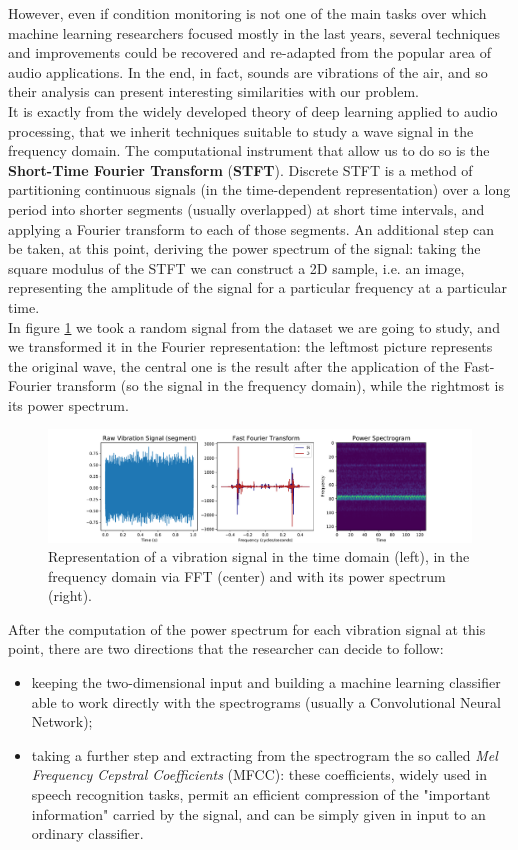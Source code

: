 \documentclass[../main.tex]{subfiles}
\begin{document}
However, even if condition monitoring is not one of the main tasks over which machine learning researchers focused mostly in the last years, several techniques and improvements could be recovered and re-adapted from the popular area of audio applications. In the end, in fact, sounds are vibrations of the air, and so their analysis can present interesting similarities with our problem.\\
It is exactly from the widely developed theory of deep learning applied to audio processing, that we inherit techniques suitable to study a wave signal in the frequency domain. The computational instrument that allow us to do so is the \textbf{Short-Time Fourier Transform} (\textbf{STFT}). Discrete STFT is a method of partitioning
continuous signals (in the time-dependent representation) over a long period into shorter segments (usually overlapped) at short time intervals, and
applying a Fourier transform to each of those segments. An additional step can be taken, at this point, deriving the power spectrum of the signal: taking the square modulus of the STFT we can construct a 2D sample, i.e. an image, representing the amplitude of the signal for a particular frequency at a particular time.\\
In figure \ref{fig:example_stft} we took a random signal from the dataset we are going to study, and we transformed it in the Fourier representation: the leftmost picture represents the original wave, the central one is the result after the application of the Fast-Fourier transform (so the signal in the frequency domain), while the rightmost is its power spectrum. 
\begin{figure}[!ht]
	\centering
	\includegraphics[width=\textwidth]{pictures/example_stft}
	\caption{Representation of a vibration signal in the time domain (left), in the frequency domain via FFT (center) and with its power spectrum (right).}
	\label{fig:example_stft}	
\end{figure}
After the computation of the power spectrum for each vibration signal at this point, there are two directions that the researcher can decide to follow:
\begin{itemize}
	\item keeping the two-dimensional input and building a machine learning classifier able to work directly with the spectrograms (usually a Convolutional Neural Network);
	\item taking a further step and extracting from the spectrogram the so called \textit{Mel Frequency Cepstral Coefficients} (MFCC): these coefficients, widely used in speech recognition tasks, permit an efficient compression of the "important information" carried by the signal, and can be simply given in input to an ordinary classifier.
\end{itemize}
\end{document}
